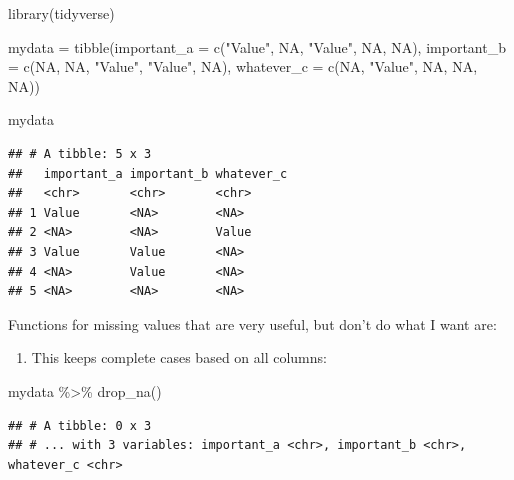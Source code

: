 \documentclass[
]{book}
\newenvironment{Shaded}{\begin{snugshade}}{\end{snugshade}}
\newcommand{\AttributeTok}[1]{\textcolor[rgb]{0.77,0.63,0.00}{#1}}
\newcommand{\ConstantTok}[1]{\textcolor[rgb]{0.00,0.00,0.00}{#1}}
\newcommand{\FunctionTok}[1]{\textcolor[rgb]{0.00,0.00,0.00}{#1}}
\newcommand{\NormalTok}[1]{#1}
\newcommand{\OtherTok}[1]{\textcolor[rgb]{0.56,0.35,0.01}{#1}}
\newcommand{\SpecialCharTok}[1]{\textcolor[rgb]{0.00,0.00,0.00}{#1}}
\newcommand{\StringTok}[1]{\textcolor[rgb]{0.31,0.60,0.02}{#1}}
\providecommand{\tightlist}{%
  \setlength{\itemsep}{0pt}\setlength{\parskip}{0pt}}
\begin{document}
\begin{Shaded}
\begin{Highlighting}[]
\FunctionTok{library}\NormalTok{(tidyverse)}

\NormalTok{mydata  }\OtherTok{=} \FunctionTok{tibble}\NormalTok{(}\AttributeTok{important\_a =} \FunctionTok{c}\NormalTok{(}\StringTok{"Value"}\NormalTok{, }\ConstantTok{NA}\NormalTok{, }\StringTok{"Value"}\NormalTok{, }\ConstantTok{NA}\NormalTok{, }\ConstantTok{NA}\NormalTok{),}
                 \AttributeTok{important\_b =} \FunctionTok{c}\NormalTok{(}\ConstantTok{NA}\NormalTok{, }\ConstantTok{NA}\NormalTok{, }\StringTok{"Value"}\NormalTok{, }\StringTok{"Value"}\NormalTok{, }\ConstantTok{NA}\NormalTok{),}
                 \AttributeTok{whatever\_c  =} \FunctionTok{c}\NormalTok{(}\ConstantTok{NA}\NormalTok{, }\StringTok{"Value"}\NormalTok{, }\ConstantTok{NA}\NormalTok{, }\ConstantTok{NA}\NormalTok{, }\ConstantTok{NA}\NormalTok{))}

\NormalTok{mydata}
\end{Highlighting}
\end{Shaded}

\begin{verbatim}
## # A tibble: 5 x 3
##   important_a important_b whatever_c
##   <chr>       <chr>       <chr>     
## 1 Value       <NA>        <NA>      
## 2 <NA>        <NA>        Value     
## 3 Value       Value       <NA>      
## 4 <NA>        Value       <NA>      
## 5 <NA>        <NA>        <NA>
\end{verbatim}

Functions for missing values that are very useful, but don't do what I want are:

\begin{enumerate}
\def\labelenumi{(\arabic{enumi})}
\tightlist
\item
  This keeps complete cases based on all columns:
\end{enumerate}

\begin{Shaded}
\begin{Highlighting}[]
\NormalTok{mydata }\SpecialCharTok{\%\textgreater{}\%} 
  \FunctionTok{drop\_na}\NormalTok{()}
\end{Highlighting}
\end{Shaded}

\begin{verbatim}
## # A tibble: 0 x 3
## # ... with 3 variables: important_a <chr>, important_b <chr>, whatever_c <chr>
\end{verbatim}
\end{document}
